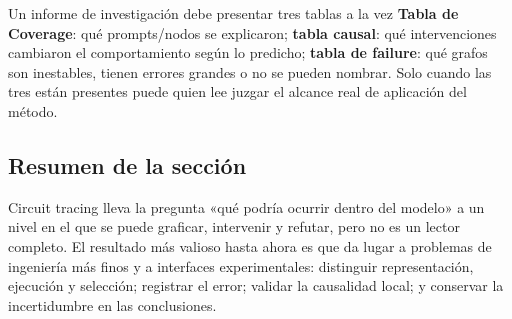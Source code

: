 
\begin{knowledgebox}{Un informe de investigación debe presentar tres tablas a la vez}
\textbf{Tabla de Coverage}: qué prompts/nodos se explicaron; \textbf{tabla causal}: qué intervenciones cambiaron el comportamiento según lo predicho; \textbf{tabla de failure}: qué grafos son inestables, tienen errores grandes o no se pueden nombrar. Solo cuando las tres están presentes puede quien lee juzgar el alcance real de aplicación del método.
\end{knowledgebox}

\subsection{Resumen de la sección}

Circuit tracing lleva la pregunta «qué podría ocurrir dentro del modelo» a un nivel en el que se puede graficar, intervenir y refutar, pero no es un lector completo. El resultado más valioso hasta ahora es que da lugar a problemas de ingeniería más finos y a interfaces experimentales: distinguir representación, ejecución y selección; registrar el error; validar la causalidad local; y conservar la incertidumbre en las conclusiones.
